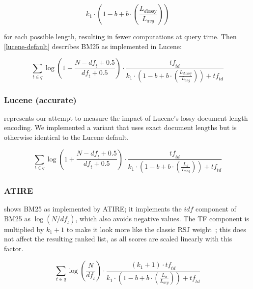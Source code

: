 \begin{equation}
	k_1 \cdot \left(1-b+b\cdot\left(\frac{L_{d\text{lossy}}}{L_{\mathit{avg}}}\right)\right)
\end{equation}

for each possible length, resulting in fewer computations at query time. Then \cref{lucene-default} describes BM25 as implemented in Lucene:

\begin{equation}
	\label{lucene-default}
	\sum_{t\in q}\log\left(1 + \frac{N-\mathit{df}_t+0.5}{\mathit{df}_t+0.5}\right)\cdot\frac{\mathit{tf}_{\mathit{td}}}{k_1\cdot\left(1-b+b\cdot\left(\frac{L_{d \text{lossy}}}{L_{\mathit{avg}}}\right)\right)+\mathit{tf}_{\mathit{td}}}
\end{equation}

\subsubsection{Lucene (accurate)}

 represents our attempt to measure the impact of Lucene’s lossy document length encoding. We implemented a variant that uses exact document lengths but is otherwise identical to the Lucene default.

\begin{equation}
	\label{lucene-accurate}
	\sum_{t\in q}\log\left(1 + \frac{N-\mathit{df}_t+0.5}{\mathit{df}_t+0.5}\right)\cdot\frac{\mathit{tf}_{\mathit{td}}}{k_1\cdot \left(1-b+b\cdot\left(\frac{L_d}{L_{\mathit{avg}}}\right)\right)+\mathit{tf}_{\mathit{td}}}
\end{equation}

\subsubsection{ATIRE~\citep{ATIRE}}
 shows BM25 as implemented by ATIRE; it implements the $\mathit{idf}$ component of BM25 as $\log(N/\mathit{df}_{t})$, which also avoids negative values. The TF component is multiplied by $k_1+1$ to make it look more like the classic RSJ weight~\citep{RSJ}; this does not affect the resulting ranked list, as all scores are scaled linearly with this factor.

\begin{equation}
	\label{atire-variant}
	\sum_{t\in q}\log\left(\frac{N}{\mathit{df}_t}\right)\cdot\frac{\left(k_1 + 1\right)\cdot \mathit{tf}_{\mathit{td}}}{k_1\cdot\left(1-b+b\cdot\left(\frac{L_{d}}{L_{\mathit{avg}}}\right)\right)+\mathit{tf}_{\mathit{td}}}
\end{equation}

